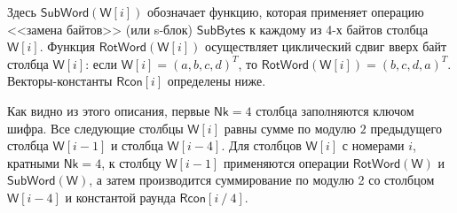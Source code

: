 Здесь $\mathsf{SubWord}(\mathsf{W}[i])$ обозначает функцию, которая применяет операцию <<замена байтов>> (или s-блок) $\mathsf{SubBytes}$ к каждому из 4-х байтов столбца $\mathsf{W}[i]$. Функция $\mathsf{RotWord}(\mathsf{W}[i])$ осуществляет циклический сдвиг вверх байт столбца $\mathsf{W}[i]$: если $\mathsf{W}[i] = (a, b, c, d)^T$, то $\mathsf{RotWord}(\mathsf{W}[i]) = (b, c, d, a)^T$. Векторы-константы $\mathsf{Rcon}[i]$ определены ниже.

Как видно из этого описания, первые $\mathsf{Nk} = 4$ столбца заполняются ключом шифра. Все следующие столбцы $\mathsf{W}[i]$ равны сумме по модулю $2$ предыдущего столбца $\mathsf{W}[i-1]$ и столбца $\mathsf{W}[i-4]$. Для столбцов $\mathsf{W}[i]$ с номерами $i$, кратными $\mathsf{Nk} = 4$, к столбцу $\mathsf{W}[i-1]$ применяются операции $\mathsf{RotWord(W)}$ и $\mathsf{SubWord(W)}$, а затем производится суммирование по модулю 2 со столбцом $\mathsf{W}[i-4]$ и константой раунда $\mathsf{Rcon}[i ~/~ 4]$.


